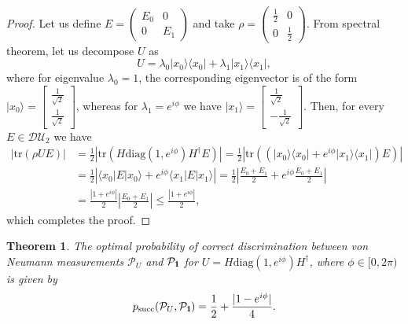 \documentclass[preprint,12pt, a4paper, dvipsnames]{elsarticle}
\newcommand{\ket}[1]{\ensuremath{|#1\rangle}}
\newcommand{\bra}[1]{\ensuremath{\langle#1|}}
\newcommand{\ketbra}[2]{\ensuremath{\ket{#1}\bra{#2}}}
\newcommand{\proj}[1]{\ensuremath{\ketbra{#1}{#1}}}
\newcommand{\1}{{\rm 1\hspace{-0.9mm}l}}
\newcommand{\Id}{{\rm 1\hspace{-0.9mm}l}}
\newcommand{\PP}{\mathcal{P}}
\newcommand{\diaguni}{\ensuremath{\mathcal{DU}}}
\newcommand{\diag}{\mathrm{diag}}
\newcommand{\tr}{\mathrm{tr}}
\newtheorem{theorem}{Theorem}
\theoremstyle{definition}
\begin{document}
\begin{proof}
	Let us define $E = \left(\begin{array}{cc}E_0&0\\0&E_1\end{array}\right)  $
	and take $\rho =
	\left(\begin{array}{cc}\frac{1}{2}&0\\0&\frac{1}{2}\end{array}\right) $.
	From spectral theorem, let us decompose $U$ as
	\begin{equation}
	U= \lambda_0 \ketbra{x_0}{x_0} + \lambda_1 \ketbra{x_1}{x_1},
	\end{equation}
	where  for eigenvalue $\lambda_0 = 1$, the corresponding
	eigenvector is
	of the form $\ket{x_0} = \left[\begin{array}{c}\frac{1}{\sqrt{2}}\\\frac{1}{\sqrt{2}}\end{array}\right]
	$,
	whereas for  $\lambda_1= e^{i \phi}$ we have $\ket{x_1} = \left[\begin{array}{c}\frac{1}{\sqrt{2}}\\-\frac{1}{\sqrt{2}}\end{array}\right]
	$.
	Then, for every $ E \in \diaguni_2 $ we have
	\begin{equation}
	\begin{split}
 | \tr (\rho U E) | & =   \frac{1}{2}  \left| \tr \left(
	H \diag(1, e^{i\phi}) H^\dagger E \right) \right| =
	\frac{1}{2} \left| \tr\left((   \proj{x_0} +e^{i \phi}\proj{x_1} ) E \right)
	\right| \\& =
	\frac{1}{2} \left|  \bra{x_0} E \ket{x_0} +  e^{i \phi}\bra{x_1} E \ket{x_1}
	\right| =
	\frac{1}{2} \left| \frac{E_0 + E_1}{2} + e^{i \phi } \frac{E_0+E_1}{2} \right|
	\\& =
	\frac{\left| 1+ e^{i \phi } \right|}{2} \left| \frac{E_0 + E_1}{2} \right| \le
\frac{|1 + e^{i \phi} | }{2},
	\end{split}
	\end{equation}
	which completes the proof.
\end{proof}


\begin{theorem}\label{th:probability}
	The optimal probability of correct discrimination between von Neumann
	measurements $\PP_U$ and $\PP_{\Id}$ for $U = H \diag(1, e^{i \phi}) H^\dagger$,
	where $\phi \in [0, 2\pi)$ is given by
	\begin{equation}
	p_{\text{succ}}(\PP_{U}, \PP_{\Id}) = \frac{1}{2} + \frac{|1 - e^{i \phi}  |}{4} .
	\end{equation}
\end{theorem}
\end{document}
